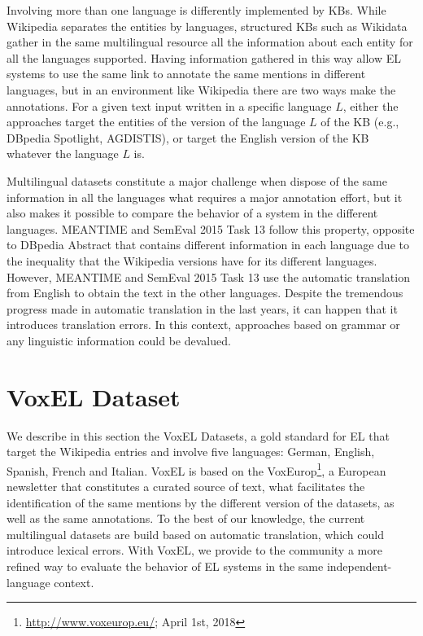 \documentclass{llncs}
\begin{document}
Involving more than one language is differently implemented by KBs. While Wikipedia separates the entities by languages, structured KBs such as Wikidata gather in the same multilingual resource all the information about each entity for all the languages supported. %
Having information gathered in this way allow EL systems to use the same link to annotate the same mentions in different languages, but in an environment like Wikipedia there are two ways make the annotations. For a given text input written in a specific language $L$, either the approaches target the entities of the version of the language $L$ of the KB (e.g., DBpedia Spotlight, AGDISTIS), or target the English version of the KB whatever the language $L$ is.%

Multilingual datasets constitute a major challenge when dispose of the same information in all the languages what requires a major annotation effort, but it also makes it possible to compare the behavior of a system in the different languages. MEANTIME and SemEval 2015 Task 13 follow this property, opposite to DBpedia Abstract that contains different information in each language due to the inequality that the Wikipedia versions have for its different languages. However, MEANTIME and SemEval 2015 Task 13 use the automatic translation from English to obtain the text in the other languages. Despite the tremendous progress made in automatic translation in the last years, it can happen that it introduces translation errors. In this context, approaches based on grammar or any linguistic information could be devalued. 




\section{VoxEL Dataset} \label{sec:survey}

We describe in this section the VoxEL Datasets, a gold standard for EL that target the Wikipedia entries and involve five languages: German, English, Spanish, French and Italian. VoxEL is based on the VoxEurop\footnote{\url{http://www.voxeurop.eu/}; April 1st, 2018}, a European newsletter that constitutes a curated source of text, what facilitates the identification of the same mentions by the different version of the datasets, as well as the same annotations. To the best of our knowledge, the current multilingual datasets are build based on automatic translation, which could introduce lexical errors. With VoxEL, we provide to the community a more refined way to evaluate the behavior of EL systems in the same independent-language context. 
\end{document}

